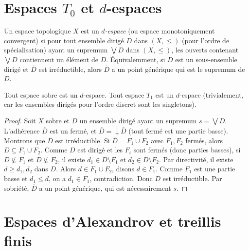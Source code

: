 \section{Espaces $T_0$ et $d$-espaces}

\begin{definition}[$d$-espace]
Un espace topologique $X$ est un \emph{$d$-espace} (ou espace monotoniquement convergent)
si pour tout ensemble dirig\'e $D$ dans $(X, \leq)$ (pour l'ordre de sp\'ecialisation)
ayant un supremum $\bigvee D$ dans $(X,\leq)$, les ouverts contenant $\bigvee D$
contiennent un \'el\'ement de $D$.
\'Equivalemment, si $D$ est un sous-ensemble dirig\'e et $\overline{D}$ est irr\'eductible,
alors $\overline{D}$ a un point g\'en\'erique qui est le supremum de $D$.
\end{definition}

\begin{theoreme}
Tout espace sobre est un $d$-espace. Tout espace $T_1$ est un $d$-espace (trivialement,
car les ensembles dirig\'es pour l'ordre discret sont les singletons).
\end{theoreme}

\begin{proof}
Soit $X$ sobre et $D$ un ensemble dirig\'e ayant un supremum $s = \bigvee D$.
L'adh\'erence $\overline{D}$ est un ferm\'e, et $\overline{D} = \downarrow\!\overline{D}$
(tout ferm\'e est une partie basse). Montrons que $\overline{D}$ est irr\'eductible.
Si $\overline{D} = F_1 \cup F_2$ avec $F_1, F_2$ ferm\'es, alors $D \subseteq F_1 \cup F_2$.
Comme $D$ est dirig\'e et les $F_i$ sont ferm\'es (donc parties basses), si $D \not\subseteq
F_1$ et $D \not\subseteq F_2$, il existe $d_1 \in D \setminus F_1$ et $d_2 \in D \setminus
F_2$. Par directivit\'e, il existe $d \geq d_1, d_2$ dans $D$. Alors $d \in F_1 \cup F_2$,
disons $d \in F_1$. Comme $F_1$ est une partie basse et $d_1 \leq d$, on a $d_1 \in F_1$,
contradiction. Donc $\overline{D}$ est irr\'eductible. Par sobri\'et\'e, $\overline{D}$
a un point g\'en\'erique, qui est n\'ecessairement $s$.
\end{proof}

\section{Espaces d'Alexandrov et treillis finis}

